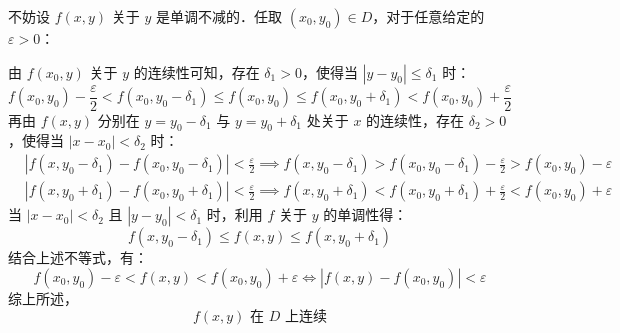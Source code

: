 \begin{myproof}
    不妨设 $f(x, y)$ 关于 $y$ 是单调不减的．任取 $(x_0, y_0) \in D$，对于任意给定的 $\varepsilon > 0$：

    由 $f(x_0, y)$ 关于 $y$ 的连续性可知，存在 $\delta_1 > 0$，使得当 $|y - y_0| \le \delta_1$ 时：
    \begin{equation}
        f(x_0, y_0) - \frac{\varepsilon}{2} < f(x_0, y_0 - \delta_1) \le f(x_0, y_0) \le f(x_0, y_0 + \delta_1) < f(x_0, y_0) + \frac{\varepsilon}{2}
    \end{equation}
    再由 $f(x, y)$ 分别在 $y = y_0 - \delta_1$ 与 $y = y_0 + \delta_1$ 处关于 $x$ 的连续性，存在 $\delta_2 > 0$，使得当 $|x - x_0| < \delta_2$ 时：
    \begin{equation}
        \begin{aligned}
             & |f(x, y_0 - \delta_1) - f(x_0, y_0 - \delta_1)| < \frac{\varepsilon}{2} \implies f(x, y_0 - \delta_1) > f(x_0, y_0 - \delta_1) - \frac{\varepsilon}{2} > f(x_0, y_0) - \varepsilon \\
             & |f(x, y_0 + \delta_1) - f(x_0, y_0 + \delta_1)| < \frac{\varepsilon}{2} \implies f(x, y_0 + \delta_1) < f(x_0, y_0 + \delta_1) + \frac{\varepsilon}{2} < f(x_0, y_0) + \varepsilon
        \end{aligned}
    \end{equation}
    当 $|x - x_0| < \delta_2$ 且 $|y - y_0| < \delta_1$ 时，利用 $f$ 关于 $y$ 的单调性得：
    \begin{equation}
        f(x, y_0 - \delta_1) \le f(x, y) \le f(x, y_0 + \delta_1)
    \end{equation}
    结合上述不等式，有：
    \begin{equation}
        f(x_0, y_0) - \varepsilon < f(x, y) < f(x_0, y_0) + \varepsilon \iff |f(x, y) - f(x_0, y_0)| < \varepsilon
    \end{equation}
    综上所述，
    \begin{equation}
        \boxed{f(x, y) \text{ 在 } D \text{ 上连续}}
    \end{equation}
\end{myproof}


